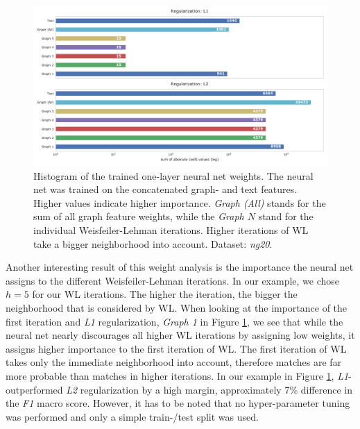 \begin{figure}[htb!]
	\centering
	{\includegraphics[width=\linewidth]{assets/figures/combined_coefs_l1_l2_regularization.pdf}%
		\caption[Statistics: Histogram of the trained weights of a one-layer neural net]{%
			Histogram of the trained one-layer neural net weights. The neural net was trained on the concatenated graph- and text features.
			Higher values indicate higher importance.
			\textit{Graph (All)} stands for the sum of all graph feature weights, while the \textit{Graph $N$} stand for the individual Weisfeiler-Lehman iterations.
			Higher iterations of WL take a bigger neighborhood into account.
			Dataset: \textit{ng20}.
		}%
		\label{fig:combined_coefs_l1_l2_regularization}}
\end{figure}

Another interesting result of this weight analysis is the importance the neural net assigns to the different Weisfeiler-Lehman iterations. In our example, we chose $h = 5$ for our WL iterations. The higher the iteration, the bigger the neighborhood that is considered by WL.
When looking at the importance of the first iteration and \textit{L1} regularization, \textit{Graph 1} in Figure \ref{fig:combined_coefs_l1_l2_regularization}, we see that while the neural net nearly discourages all higher WL iterations by assigning low weights, it assigns higher importance to the first iteration of WL.
The first iteration of WL takes only the immediate neighborhood into account, therefore matches are far more probable than matches in higher iterations.
In our example in Figure \ref{fig:combined_coefs_l1_l2_regularization}, \textit{L1}- outperformed \textit{L2} regularization by a high margin, approximately 7\% difference in the \textit{F1} macro score.
However, it has to be noted that no hyper-parameter tuning was performed and only a simple train-/test split was used.

